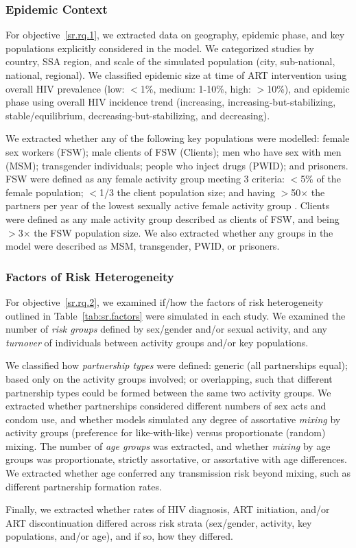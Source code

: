 \subsubsection{Epidemic Context}\label{sr.meth.data.context}
For objective~\ref{sr.rq.1}, we extracted data on
geography, epidemic phase, and key populations explicitly considered in the model.
We categorized studies by country, SSA region, and
scale of the simulated population (city, sub-national, national, regional).
We classified epidemic size at time of ART intervention using
overall HIV prevalence (low: $<$1\%, medium: 1-10\%, high: $>$10\%),
and epidemic phase using overall HIV incidence trend
(increasing, increasing-but-stabilizing, stable/equilibrium, decreasing-but-stabilizing, and decreasing).
\par
We extracted whether any of the following key populations were modelled:
female sex workers (FSW);
male clients of FSW (Clients);
men who have sex with men (MSM);
transgender individuals;
people who inject drugs (PWID);
and prisoners.
FSW were defined as any female activity group meeting 3 criteria:
{$<$5\%} of the female population;
{$<$1/3} the client population size; and
having {$>$50$\times$} the partners per year of
the lowest sexually active female activity group \cite{Vandepitte2006,Scorgie2012}.
Clients were defined as any male activity group
described as clients of FSW, and being {$>$3$\times$} the FSW population size.
We also extracted whether any groups in the model were described as
MSM, transgender, PWID, or prisoners.
\subsubsection{Factors of Risk Heterogeneity}\label{sr.meth.data.factors}
For objective~\ref{sr.rq.2}, we examined if/how
the factors of risk heterogeneity outlined in Table~\ref{tab:sr.factors}
were simulated in each study.
We examined the number of \emph{risk groups} defined by sex/gender and/or sexual activity, and
any \emph{turnover} of individuals between activity groups and/or key populations.
\par
We classified how \emph{partnership types} were defined:
generic (all partnerships equal);
based only on the activity groups involved;
or overlapping, such that different partnership types could be formed between the same two activity groups.
We extracted whether partnerships considered different
numbers of sex acts and condom use,
and whether models simulated any degree of assortative \emph{mixing} by activity groups
(preference for like-with-like) versus proportionate (random) mixing.
The number of \emph{age groups} was extracted, and whether \emph{mixing} by age groups was
proportionate, strictly assortative, or assortative with age differences.
We extracted whether age conferred any transmission risk beyond mixing,
such as different partnership formation rates.
\par
Finally, we extracted whether rates of HIV diagnosis, ART initiation, and/or ART discontinuation
differed across risk strata (sex/gender, activity, key populations, and/or age),
and if so, how they differed.
